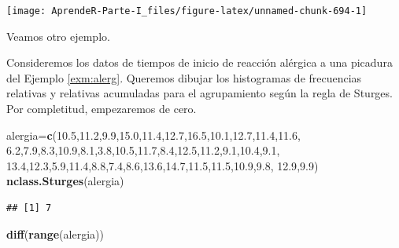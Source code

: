 \documentclass[]{book}
\newenvironment{Shaded}{\begin{snugshade}}{\end{snugshade}}
\newcommand{\FloatTok}[1]{\textcolor[rgb]{0.00,0.00,0.81}{#1}}
\newcommand{\KeywordTok}[1]{\textcolor[rgb]{0.13,0.29,0.53}{\textbf{#1}}}
\newcommand{\NormalTok}[1]{#1}
\theoremstyle{definition}
\theoremstyle{definition}
\theoremstyle{definition}
\theoremstyle{remark}
\let\BeginKnitrBlock\begin \let\EndKnitrBlock\end
\begin{document}
\begin{center}\texttt{[image: AprendeR-Parte-I\_files/figure-latex/unnamed-chunk-694-1]} \end{center}

Veamos otro ejemplo.

\BeginKnitrBlock{example}
\protect\hypertarget{exm:unnamed-chunk-695}{}{\label{exm:unnamed-chunk-695} }Consideremos los datos de tiempos de inicio de reacción alérgica a una picadura del Ejemplo \ref{exm:alerg}. Queremos dibujar los histogramas de frecuencias relativas y relativas acumuladas para el agrupamiento según la regla de Sturges. Por completitud, empezaremos de cero.
\EndKnitrBlock{example}

\begin{Shaded}
\begin{Highlighting}[]
\NormalTok{alergia=}\KeywordTok{c}\NormalTok{(}\FloatTok{10.5}\NormalTok{,}\FloatTok{11.2}\NormalTok{,}\FloatTok{9.9}\NormalTok{,}\FloatTok{15.0}\NormalTok{,}\FloatTok{11.4}\NormalTok{,}\FloatTok{12.7}\NormalTok{,}\FloatTok{16.5}\NormalTok{,}\FloatTok{10.1}\NormalTok{,}\FloatTok{12.7}\NormalTok{,}\FloatTok{11.4}\NormalTok{,}\FloatTok{11.6}\NormalTok{,}
  \FloatTok{6.2}\NormalTok{,}\FloatTok{7.9}\NormalTok{,}\FloatTok{8.3}\NormalTok{,}\FloatTok{10.9}\NormalTok{,}\FloatTok{8.1}\NormalTok{,}\FloatTok{3.8}\NormalTok{,}\FloatTok{10.5}\NormalTok{,}\FloatTok{11.7}\NormalTok{,}\FloatTok{8.4}\NormalTok{,}\FloatTok{12.5}\NormalTok{,}\FloatTok{11.2}\NormalTok{,}\FloatTok{9.1}\NormalTok{,}\FloatTok{10.4}\NormalTok{,}\FloatTok{9.1}\NormalTok{,}
  \FloatTok{13.4}\NormalTok{,}\FloatTok{12.3}\NormalTok{,}\FloatTok{5.9}\NormalTok{,}\FloatTok{11.4}\NormalTok{,}\FloatTok{8.8}\NormalTok{,}\FloatTok{7.4}\NormalTok{,}\FloatTok{8.6}\NormalTok{,}\FloatTok{13.6}\NormalTok{,}\FloatTok{14.7}\NormalTok{,}\FloatTok{11.5}\NormalTok{,}\FloatTok{11.5}\NormalTok{,}\FloatTok{10.9}\NormalTok{,}\FloatTok{9.8}\NormalTok{,}
  \FloatTok{12.9}\NormalTok{,}\FloatTok{9.9}\NormalTok{)}
\KeywordTok{nclass.Sturges}\NormalTok{(alergia)}
\end{Highlighting}
\end{Shaded}

\begin{verbatim}
## [1] 7
\end{verbatim}

\begin{Shaded}
\begin{Highlighting}[]
\KeywordTok{diff}\NormalTok{(}\KeywordTok{range}\NormalTok{(alergia))}
\end{Highlighting}
\end{Shaded}
\end{document}
